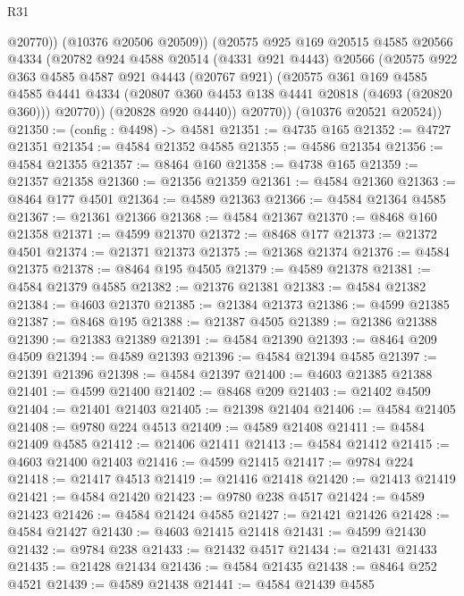 \begin{lexlean}{R31}
\begin{coremodule}
              @20770))
          (@10376 @20506 @20509))
        (@20575
          @925
          @169
          @20515
          @4585
          @20566
          @4334
          (@20782
            @924
            @4588
            @20514
            (@4331 @921 @4443)
            @20566
            (@20575
              @922
              @363
              @4585
              @4587
              @921
              @4443
              (@20767 @921)
              (@20575
                @361
                @169
                @4585
                @4585
                @4441
                @4334
                (@20807 @360 @4453 @138 @4441 @20818 (@4693 (@20820 @360)))
                @20770))
            (@20828 @920 @4440))
          @20770))
      (@10376 @20521 @20524))
@21350 := (config : @4498) -> @4581
@21351 := @4735 @165
@21352 := @4727 @21351
@21354 := @4584 @21352 @4585
@21355 := @4586 @21354
@21356 := @4584 @21355
@21357 := @8464 @160
@21358 := @4738 @165
@21359 := @21357 @21358
@21360 := @21356 @21359
@21361 := @4584 @21360
@21363 := @8464 @177 @4501
@21364 := @4589 @21363
@21366 := @4584 @21364 @4585
@21367 := @21361 @21366
@21368 := @4584 @21367
@21370 := @8468 @160 @21358
@21371 := @4599 @21370
@21372 := @8468 @177
@21373 := @21372 @4501
@21374 := @21371 @21373
@21375 := @21368 @21374
@21376 := @4584 @21375
@21378 := @8464 @195 @4505
@21379 := @4589 @21378
@21381 := @4584 @21379 @4585
@21382 := @21376 @21381
@21383 := @4584 @21382
@21384 := @4603 @21370
@21385 := @21384 @21373
@21386 := @4599 @21385
@21387 := @8468 @195
@21388 := @21387 @4505
@21389 := @21386 @21388
@21390 := @21383 @21389
@21391 := @4584 @21390
@21393 := @8464 @209 @4509
@21394 := @4589 @21393
@21396 := @4584 @21394 @4585
@21397 := @21391 @21396
@21398 := @4584 @21397
@21400 := @4603 @21385 @21388
@21401 := @4599 @21400
@21402 := @8468 @209
@21403 := @21402 @4509
@21404 := @21401 @21403
@21405 := @21398 @21404
@21406 := @4584 @21405
@21408 := @9780 @224 @4513
@21409 := @4589 @21408
@21411 := @4584 @21409 @4585
@21412 := @21406 @21411
@21413 := @4584 @21412
@21415 := @4603 @21400 @21403
@21416 := @4599 @21415
@21417 := @9784 @224
@21418 := @21417 @4513
@21419 := @21416 @21418
@21420 := @21413 @21419
@21421 := @4584 @21420
@21423 := @9780 @238 @4517
@21424 := @4589 @21423
@21426 := @4584 @21424 @4585
@21427 := @21421 @21426
@21428 := @4584 @21427
@21430 := @4603 @21415 @21418
@21431 := @4599 @21430
@21432 := @9784 @238
@21433 := @21432 @4517
@21434 := @21431 @21433
@21435 := @21428 @21434
@21436 := @4584 @21435
@21438 := @8464 @252 @4521
@21439 := @4589 @21438
@21441 := @4584 @21439 @4585

\end{coremodule}
\end{lexlean}
